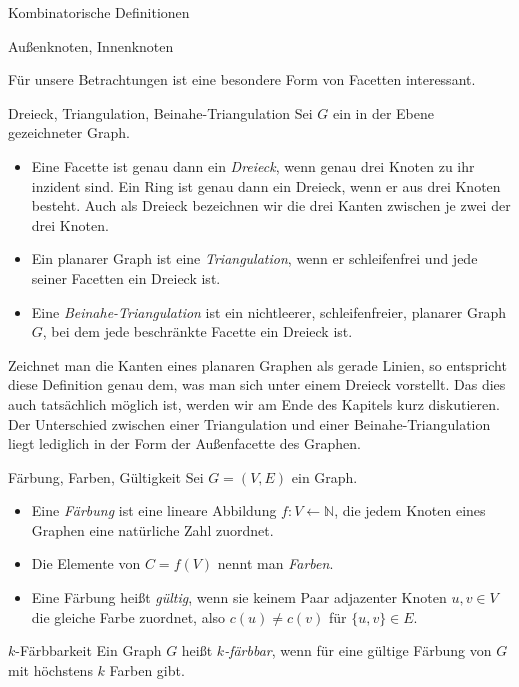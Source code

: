 \begin{section}{Kombinatorische Definitionen}
\begin{definition}{Außenknoten, Innenknoten}
  \end{definition}

  Für unsere Betrachtungen ist eine besondere Form von Facetten interessant. 
  
  \begin{definition}{Dreieck, Triangulation, Beinahe-Triangulation}
   Sei $G$ ein in der Ebene gezeichneter Graph.
   \begin{itemize}
   \item Eine Facette ist genau dann ein \textit{Dreieck}, wenn genau drei Knoten zu ihr inzident sind. Ein Ring ist genau dann ein Dreieck, wenn er aus drei Knoten besteht. Auch als Dreieck bezeichnen wir die drei Kanten zwischen je zwei der drei Knoten.
   \item Ein planarer Graph ist eine \textit{Triangulation}, wenn er schleifenfrei und jede seiner Facetten ein Dreieck ist. 
   \item Eine \textit{Beinahe-Triangulation} ist ein nichtleerer, schleifenfreier, planarer Graph $G$, bei dem jede beschränkte Facette ein Dreieck ist. 
   \end{itemize}
  \end{definition}
  
  Zeichnet man die Kanten eines planaren Graphen als gerade Linien, so entspricht diese Definition genau dem, was man sich unter einem Dreieck vorstellt. Das dies auch tatsächlich möglich ist, werden wir am Ende des Kapitels kurz diskutieren. Der Unterschied zwischen einer Triangulation und einer Beinahe-Triangulation liegt lediglich in der Form der Außenfacette des Graphen. 
 
  \begin{definition}{Färbung, Farben, Gültigkeit}
   Sei $G=(V,E)$ ein Graph.
   \begin{itemize}
   \item Eine \textit{Färbung} ist eine lineare Abbildung $f: V \leftarrow \mathbb{N}$, die jedem Knoten eines Graphen eine natürliche Zahl zuordnet. 
   \item Die Elemente von $C  =f(V)$ nennt man \textit{Farben}. 
   \item Eine Färbung heißt \textit{gültig}, wenn sie keinem Paar adjazenter Knoten $u,v \in V$ die gleiche Farbe zuordnet, also $c(u) \neq c(v)$ für $\{u,v\}\in E$. 
   \end{itemize}
  \end{definition}
  
  \begin{definition}{$k$-Färbbarkeit}
   Ein Graph $G$ heißt \textit{$k$-färbbar}, wenn für eine gültige Färbung von $G$ mit höchstens $k$ Farben gibt.
  \end{definition}
  

\end{section}
